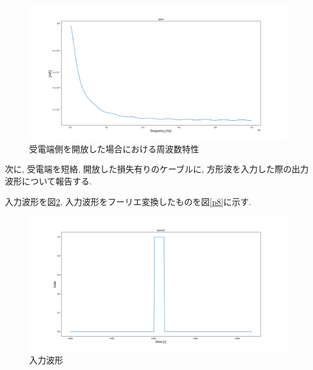 \documentclass[a4j,12pt,]{jarticle}
\begin{document}
\begin{figure}[H]
  \begin{center}
    \includegraphics[width=160mm]{report/openAtReceivingEndWithAttenuationConstantLogScale.png}
    \caption{受電端側を開放した場合における周波数特性}
    \label{p6}
  \end{center}
\end{figure}

次に, 受電端を短絡, 開放した損失有りのケーブルに, 方形波を入力した際の出力波形について報告する.

入力波形を図\ref{p7}, 入力波形をフーリエ変換したものを図\ref{p8}に示す.

\begin{figure}[H]
  \begin{center}
    \includegraphics[width=160mm]{report/inputWaveformTimeAxis.png}
    \caption{入力波形}
    \label{p7}
  \end{center}
\end{figure}
\end{document}
